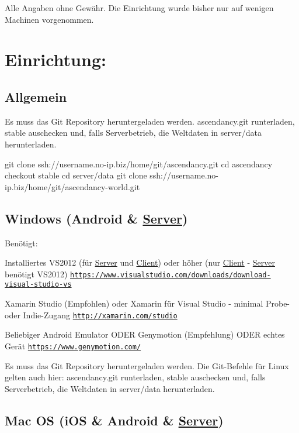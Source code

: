 Alle Angaben ohne Gewähr. Die Einrichtung wurde bisher nur auf wenigen Machinen vorgenommen.

\section*{Einrichtung\+:}

\subsection*{Allgemein}

Es muss das Git Repository heruntergeladen werden. ascendancy.\+git runterladen, stable auschecken und, falls Serverbetrieb, die Weltdaten in server/data herunterladen.

git clone ssh\+://username.no-\/ip.\+biz/home/git/ascendancy.git cd ascendancy checkout stable cd server/data git clone ssh\+://username.no-\/ip.\+biz/home/git/ascendancy-\/world.git

\subsection*{Windows (Android \& \hyperlink{namespaceServer}{Server})}

Benötigt\+:
\begin{DoxyItemize}
\item Installiertes V\+S2012 (für \hyperlink{namespaceServer}{Server} und \hyperlink{namespaceClient}{Client}) oder höher (nur \hyperlink{namespaceClient}{Client} -\/ \hyperlink{namespaceServer}{Server} benötigt V\+S2012) \href{https://www.visualstudio.com/downloads/download-visual-studio-vs}{\tt https\+://www.\+visualstudio.\+com/downloads/download-\/visual-\/studio-\/vs}
\item Xamarin Studio (Empfohlen) oder Xamarin für Visual Studio -\/ minimal Probe-\/ oder Indie-\/\+Zugang \href{http://xamarin.com/studio}{\tt http\+://xamarin.\+com/studio}
\item Beliebiger Android Emulator O\+D\+E\+R Genymotion (Empfehlung) O\+D\+E\+R echtes Gerät \href{https://www.genymotion.com/}{\tt https\+://www.\+genymotion.\+com/}
\end{DoxyItemize}

Es muss das Git Repository heruntergeladen werden. Die Git-\/\+Befehle für Linux gelten auch hier\+: ascendancy.\+git runterladen, stable auschecken und, falls Serverbetrieb, die Weltdaten in server/data herunterladen.

\subsection*{Mac O\+S (i\+O\+S \& Android \& \hyperlink{namespaceServer}{Server})}

